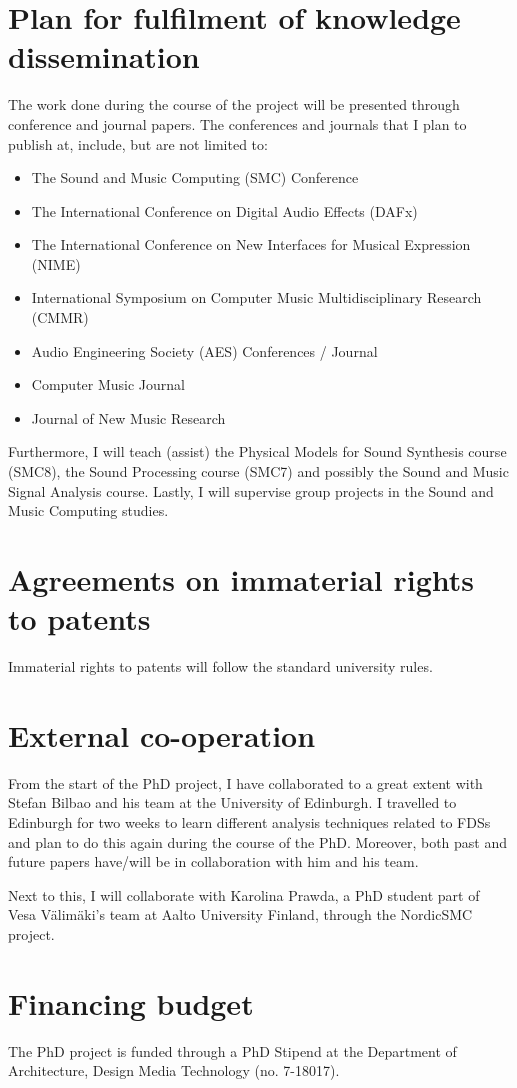 \section{Plan for fulfilment of knowledge dissemination}
The work done during the course of the project will be presented through conference and journal papers. The conferences and journals that I plan to publish at, include, but are not limited to:
\begin{itemize}
\item The Sound and Music Computing (SMC) Conference
\item The International Conference on Digital Audio Effects (DAFx)
\item The International Conference on New Interfaces for Musical Expression (NIME)
\item International Symposium on Computer Music Multidisciplinary Research (CMMR)
\item Audio Engineering Society (AES) Conferences / Journal
\item Computer Music Journal
\item Journal of New Music Research
\end{itemize}
Furthermore, I will teach (assist) the Physical Models for Sound Synthesis course (SMC8), the Sound Processing course (SMC7) and possibly the Sound and Music Signal Analysis course. Lastly, I will supervise group projects in the Sound and Music Computing studies.

\section{Agreements on immaterial rights to patents}
Immaterial rights to patents will follow the standard university rules.

\section{External co-operation}
From the start of the PhD project,  I have collaborated to a great extent with Stefan Bilbao and his team at the University of Edinburgh. I travelled to Edinburgh for two weeks to learn different analysis techniques related to FDSs and plan to do this again during the course of the PhD. Moreover, both past and future papers have/will be in collaboration with him and his team.

Next to this, I will collaborate with Karolina Prawda, a PhD student part of Vesa V\"alim\"aki's team at Aalto University Finland, through the NordicSMC project.

\section{Financing budget}
The PhD project is funded through a PhD Stipend at the Department of Architecture, Design Media Technology (no. 7-18017).
